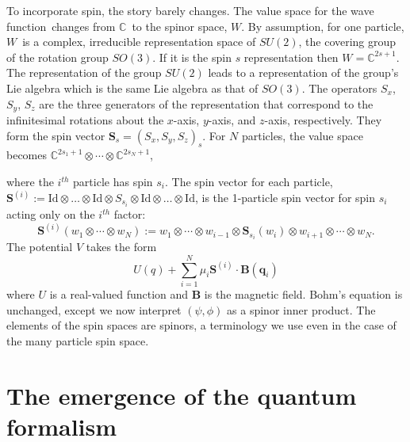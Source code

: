 \documentclass[11pt]{article}
\theoremstyle{remark}
\begin{document}
To incorporate spin, the story barely changes.  
The value space for the wave function\  changes
from \ensuremath{\mathbb{C}}\ to 
the spinor space, \ensuremath{W}. By assumption, for one particle, \ensuremath{W}\ is a
complex, irreducible representation space of $SU(2)$, the covering
group of the rotation group $SO(3)$. If it is the spin $s$
representation  then $\ensuremath{W} = \ensuremath{\ensuremath{\mathbb{C}}^{2s +1}}$. The representation of the group
$SU(2)$ leads to a representation of the group's Lie algebra which is
the same Lie algebra as that of $SO(3)$. 
The operators   \ensuremath{{S_{x}}}, \ensuremath{{S_{y}}},
\ensuremath{{S_{z}}} are the three generators of the representation that
correspond to the 
infinitesimal rotations about the $x$-axis, $y$-axis, and $z$-axis,
respectively. They
form the spin vector  $\ensuremath{\boldsymbol{S}}_s = (\ensuremath{{S_{x}}}, \ensuremath{{S_{y}}},
\ensuremath{{S_{z}}})_s$. 
For $N$ particles, the value space becomes $ \ensuremath{\mathbb{C}}^{2s_1 +1}
\otimes \cdots \otimes \ensuremath{\mathbb{C}}^{2s_N +1}$,


 where the $i^{th}$ particle has spin $s_i$.  
The spin vector for each particle, $\ensuremath{\boldsymbol{S}}^{(i)}:= \ensuremath{\text{Id}} \otimes
\ldots \otimes  \ensuremath{\text{Id}}
\otimes S_{s_i} \otimes \ensuremath{\text{Id}} \otimes \ldots \otimes \ensuremath{\text{Id}} $, is the 1-particle
spin vector for spin $s_i$ acting only on the
 $i^{th}$ factor: 
\begin{equation*} 
\ensuremath{\boldsymbol{S}}^{(i)} (w_1 \otimes \cdots \otimes w_N)
\ensuremath{:=}
w_1 \otimes \cdots \otimes w_{i-1} \otimes \ensuremath{\boldsymbol{S}}_{s_i} (w_i) \otimes
w_{i+1} \otimes \cdots \otimes w_{N}.
\end{equation*}
The potential $V$ takes the form 
\begin{equation*}
U(q) + \sum_{i = 1}^{N} \ensuremath{\mu}_i \ensuremath{\boldsymbol{S}}^{(i)} \cdot \boldsymbol{B}(\ensuremath{\boldsymbol{q}}_i)
\end{equation*}
where $U$ is a real-valued function and $\boldsymbol{B}$ is the
magnetic field. Bohm's equation is unchanged, except we now interpret
\ensuremath{({\psi}, {\phi})} as a spinor inner product. The elements of the spin
spaces are spinors, a terminology we use even in the case of
the many particle spin space. 


\section[The quantum story]{The
emergence of the 
quantum formalism}
\end{document}
